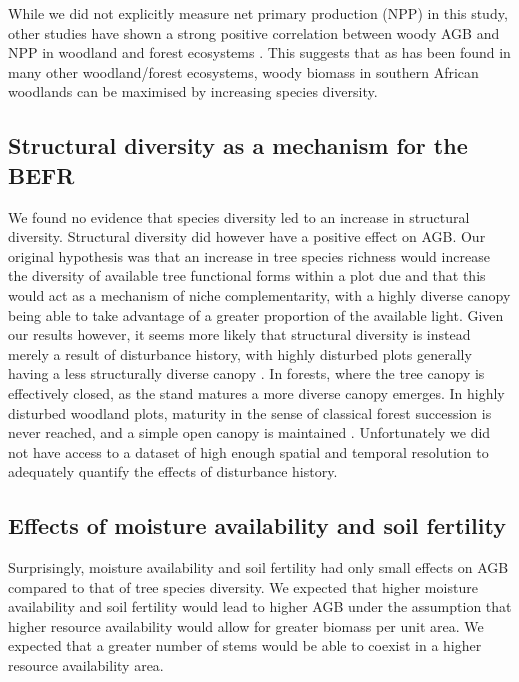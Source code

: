 \documentclass[11pt,a4paper]{article}
\begin{document}

While we did not explicitly measure net primary production (NPP) in this study, other studies have shown a strong positive correlation between woody AGB and NPP in woodland and forest ecosystems \citep{}. This suggests that as has been found in many other woodland/forest ecosystems, woody biomass in southern African woodlands can be maximised by increasing species diversity. 

\subsection{Structural diversity as a mechanism for the BEFR}

We found no evidence that species diversity led to an increase in structural diversity. Structural diversity did however have a positive effect on AGB. Our original hypothesis was that an increase in tree species richness would increase the diversity of available tree functional forms within a plot due and that this would act as a mechanism of niche complementarity, with a highly diverse canopy being able to take advantage of a greater proportion of the available light. Given our results however, it seems more likely that structural diversity is instead merely a result of disturbance history, with highly disturbed plots generally having a less structurally diverse canopy \citep{}. In forests, where the tree canopy is effectively closed, as the stand matures a more diverse canopy emerges. In highly disturbed woodland plots, maturity in the sense of classical forest succession is never reached, and a simple open canopy is maintained \citep{}. Unfortunately we did not have access to a dataset of high enough spatial and temporal resolution to adequately quantify the effects of disturbance history. 

\subsection{Effects of moisture availability and soil fertility}

Surprisingly, moisture availability and soil fertility had only small effects on AGB compared to that of tree species diversity. We expected that higher moisture availability and soil fertility would lead to higher AGB under the assumption that higher resource availability would allow for greater biomass per unit area. We expected that a greater number of stems would be able to coexist in a higher resource availability area.
\end{document}
